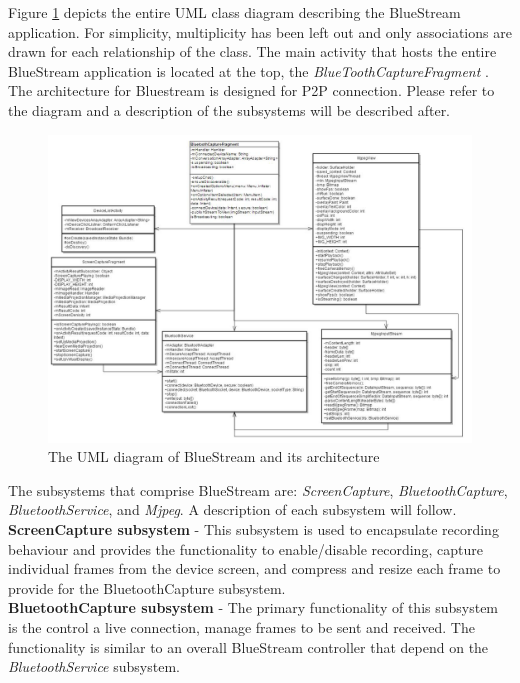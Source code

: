 \documentclass[a4paper,12pt]{article}
\begin{document}
Figure \ref{fig:UML} depicts the entire UML class diagram describing the BlueStream application. For simplicity, multiplicity has been left out and only associations are drawn for each relationship of the class. The main activity that hosts the entire BlueStream application is located at the top, the \textit{BlueToothCaptureFragment} . The architecture for Bluestream is designed for P2P connection. Please refer to the diagram and a description of the subsystems will be described after.

\begin{figure}[!ht]
\centering
\includegraphics[scale=.5]{Figures/Figure7.png}
\caption{The UML diagram of BlueStream and its architecture}
\label{fig:UML}
\end{figure}

The subsystems that comprise BlueStream are: \textit{ScreenCapture}, \textit{BluetoothCapture}, \textit{BluetoothService}, and \textit{Mjpeg}. A description of each subsystem will follow.\\

\noindent \textbf{ScreenCapture subsystem} - This subsystem is used to encapsulate recording behaviour and provides the functionality to enable/disable recording, capture individual frames from the device screen, and compress and resize each frame to provide for the BluetoothCapture subsystem.\\

\noindent \textbf{BluetoothCapture subsystem} - The primary functionality of this subsystem is the control a live connection, manage frames to be sent and received. The functionality is similar to an overall BlueStream controller that depend on the \textit{BluetoothService} subsystem.\\
\end{document}

